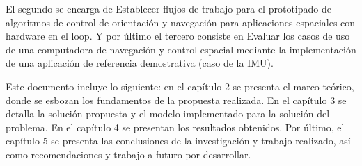 El segundo se encarga de Establecer flujos de trabajo para el prototipado de algoritmos de control de orientación y navegación para aplicaciones espaciales con hardware en el loop. Y por último el tercero consiste en Evaluar los casos de uso de una computadora de navegación y control espacial mediante la implementación de una aplicación de referencia demostrativa (caso de la IMU).

Este documento incluye lo siguiente: en el capítulo 2 se presenta el marco teórico, donde se esbozan los fundamentos de la propuesta realizada. En el capítulo 3 se detalla la solución propuesta y el modelo implementado para la solución del problema. En el capítulo 4 se presentan los resultados obtenidos. Por último, el capítulo 5 se presenta las conclusiones de la investigación y trabajo realizado, así como recomendaciones y trabajo a futuro por desarrollar.

